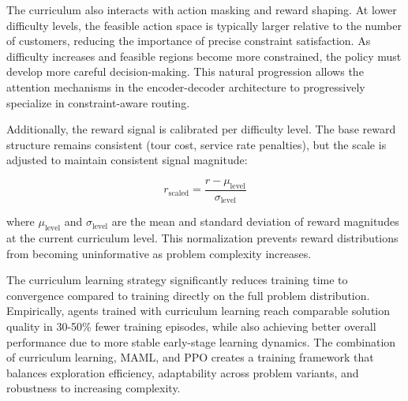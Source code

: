 The curriculum also interacts with action masking and reward shaping. At lower difficulty levels, the feasible action space is typically larger relative to the number of customers, reducing the importance of precise constraint satisfaction. As difficulty increases and feasible regions become more constrained, the policy must develop more careful decision-making. This natural progression allows the attention mechanisms in the encoder-decoder architecture to progressively specialize in constraint-aware routing.

Additionally, the reward signal is calibrated per difficulty level. The base reward structure remains consistent (tour cost, service rate penalties), but the scale is adjusted to maintain consistent signal magnitude:

\begin{equation}
r_{\text{scaled}} = \frac{r - \mu_{\text{level}}}{\sigma_{\text{level}}}
\end{equation}

where $\mu_{\text{level}}$ and $\sigma_{\text{level}}$ are the mean and standard deviation of reward magnitudes at the current curriculum level. This normalization prevents reward distributions from becoming uninformative as problem complexity increases.

The curriculum learning strategy significantly reduces training time to convergence compared to training directly on the full problem distribution. Empirically, agents trained with curriculum learning reach comparable solution quality in 30-50\% fewer training episodes, while also achieving better overall performance due to more stable early-stage learning dynamics. The combination of curriculum learning, MAML, and PPO creates a training framework that balances exploration efficiency, adaptability across problem variants, and robustness to increasing complexity.
